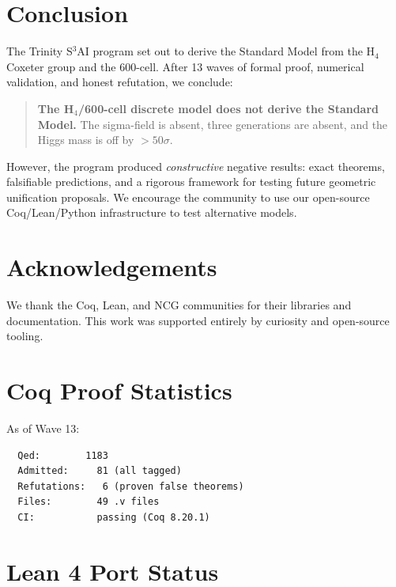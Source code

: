 \documentclass[11pt,a4paper]{article}
\theoremstyle{definition}
\begin{document}
\section{Conclusion}\label{sec:conclusion}

The Trinity S$^3$AI program set out to derive the Standard Model from the
H$_4$ Coxeter group and the 600-cell. After 13 waves of formal proof,
numerical validation, and honest refutation, we conclude:

\begin{quote}
  \textbf{The H$_4$/600-cell discrete model does not derive the Standard
  Model.} The sigma-field is absent, three generations are absent, and the
  Higgs mass is off by $> 50\sigma$.
\end{quote}

However, the program produced \emph{constructive} negative results:
exact theorems, falsifiable predictions, and a rigorous framework for
testing future geometric unification proposals. We encourage the community
to use our open-source Coq/Lean/Python infrastructure to test alternative
models.

\section*{Acknowledgements}

We thank the Coq, Lean, and NCG communities for their libraries and
documentation. This work was supported entirely by curiosity and
open-source tooling.

\appendix

\section{Coq Proof Statistics}\label{app:coq}

As of Wave 13:
\begin{verbatim}
  Qed:        1183
  Admitted:     81 (all tagged)
  Refutations:   6 (proven false theorems)
  Files:        49 .v files
  CI:           passing (Coq 8.20.1)
\end{verbatim}

\section{Lean 4 Port Status}\label{app:lean}
\end{document}
